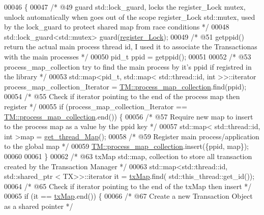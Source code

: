 \begin{DoxyCode}
00046 \{
00047   \textcolor{comment}{/* @49 guard std::lock\_guard, locks the register\_Lock mutex, unlock automatically when goes out of the
       scope register\_Lock std::mutex, used by the lock\_guard to protect shared map from race conditions */}
00048     std::lock\_guard<std::mutex> guard(\hyperlink{class_t_m_aeb26546681bfe64e21606b8c012bb8c3_aeb26546681bfe64e21606b8c012bb8c3}{register\_Lock});
00049     \textcolor{comment}{/* @51 getppid() return the actual main process thread id, I used it to associate the Transactionas
       with the main processes */}
00050     pid\_t ppid = getppid();
00051 
00052     \textcolor{comment}{/* @53 process\_map\_collection try to find the main process by it's ppid if registred in the library */}
00053     std::map<pid\_t, std::map< std::thread::id, int >>::iterator process\_map\_collection\_Iterator = 
      \hyperlink{class_t_m_a6d417b18213968da2a70a914e80d639b_a6d417b18213968da2a70a914e80d639b}{TM::process\_map\_collection}.find(ppid);
00054     \textcolor{comment}{/* @55 Check if iterator pointing to the end of the process map then register */}
00055     \textcolor{keywordflow}{if} (process\_map\_collection\_Iterator == \hyperlink{class_t_m_a6d417b18213968da2a70a914e80d639b_a6d417b18213968da2a70a914e80d639b}{TM::process\_map\_collection}.end()) \{
00056         \textcolor{comment}{/* @57 Require new map to insert to the process map as a value by the ppid key  */}
00057         std::map< std::thread::id, int >map = \hyperlink{class_t_m_afb8bc9f42fe06c52747beb7f4c46915c_afb8bc9f42fe06c52747beb7f4c46915c}{get\_thread\_Map}();
00058         \textcolor{comment}{/* @59 Register main process/application to the global map  */}
00059         \hyperlink{class_t_m_a6d417b18213968da2a70a914e80d639b_a6d417b18213968da2a70a914e80d639b}{TM::process\_map\_collection}.insert(\{ppid, map\});
00060 
00061     \}
00062     \textcolor{comment}{/* @63 txMap std::map, collection to store all transaction created by the Transaction Manager */}
00063     std::map<std::thread::id, std::shared\_ptr < TX>>::iterator it = \hyperlink{class_t_m_a0333dfa193ea99d7626de74a2b932e9b_a0333dfa193ea99d7626de74a2b932e9b}{txMap}.find(
      std::this\_thread::get\_id());
00064     \textcolor{comment}{/* @65 Check if iterator pointing to the end of the txMap then insert */}
00065     \textcolor{keywordflow}{if} (it == \hyperlink{class_t_m_a0333dfa193ea99d7626de74a2b932e9b_a0333dfa193ea99d7626de74a2b932e9b}{txMap}.end()) \{
00066         \textcolor{comment}{/* @67 Create a new Transaction Object as a shared pointer */}

\end{DoxyCode}
